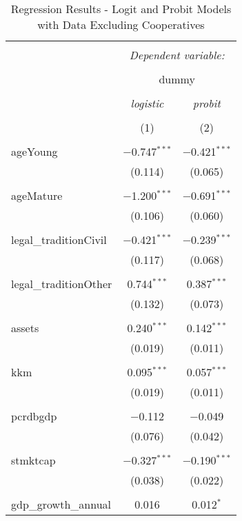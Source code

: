 \documentclass[a4paper,nobind]{templates/ociamthesis}
\begin{document}
\begin{table}[!htbp] \centering 
  \caption{Regression Results - Logit and Probit Models with Data Excluding Cooperatives} 
  \label{} 
\footnotesize 
\begin{tabular}{@{\extracolsep{5pt}}lcc} 
\\[-1.8ex]\hline 
\hline \\[-1.8ex] 
 & \multicolumn{2}{c}{\textit{Dependent variable:}} \\ 
\cline{2-3} 
\\[-1.8ex] & \multicolumn{2}{c}{dummy} \\ 
\\[-1.8ex] & \textit{logistic} & \textit{probit} \\ 
\\[-1.8ex] & (1) & (2)\\ 
\hline \\[-1.8ex] 
 ageYoung & $-$0.747$^{***}$ & $-$0.421$^{***}$ \\ 
  & (0.114) & (0.065) \\ 
  & & \\ 
 ageMature & $-$1.200$^{***}$ & $-$0.691$^{***}$ \\ 
  & (0.106) & (0.060) \\ 
  & & \\ 
 legal\_traditionCivil & $-$0.421$^{***}$ & $-$0.239$^{***}$ \\ 
  & (0.117) & (0.068) \\ 
  & & \\ 
 legal\_traditionOther & 0.744$^{***}$ & 0.387$^{***}$ \\ 
  & (0.132) & (0.073) \\ 
  & & \\ 
 assets & 0.240$^{***}$ & 0.142$^{***}$ \\ 
  & (0.019) & (0.011) \\ 
  & & \\ 
 kkm & 0.095$^{***}$ & 0.057$^{***}$ \\ 
  & (0.019) & (0.011) \\ 
  & & \\ 
 pcrdbgdp & $-$0.112 & $-$0.049 \\ 
  & (0.076) & (0.042) \\ 
  & & \\ 
 stmktcap & $-$0.327$^{***}$ & $-$0.190$^{***}$ \\ 
  & (0.038) & (0.022) \\ 
  & & \\ 
 gdp\_growth\_annual & 0.016 & 0.012$^{*}$ \\ 

\end{tabular}
\end{table}
\end{document}
